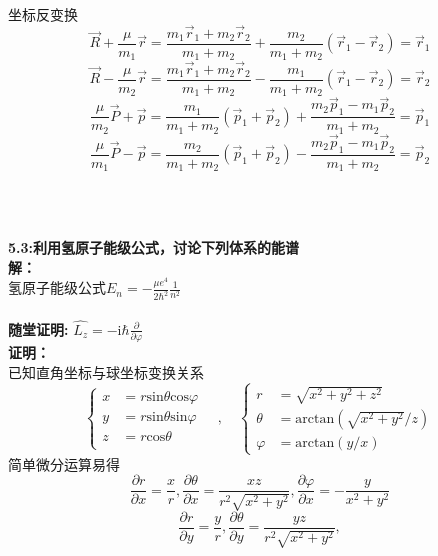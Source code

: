 \documentclass[a4paper]{article}
\newcommand{\qed}{
    \rightline{Q.E.D.}\\
    }
\newcommand{\dis}{\displaystyle}
\begin{document}
\begin{CJK*}{UTF8}{song}
{    坐标反变换
    $$\vec{R} + \frac{\mu}{m_{1}}\vec{r} = 
        \frac{m_{1}\vec{r}_{1}+
        m_{2}\vec{r}_{2}}{m_{1}+m_{2}}+\frac{m_{2}}{m_{1}+m_{2}}
        (\vec{r}_{1}-\vec{r}_{2})
        =\vec{r}_{1}$$
    $$\vec{R} - \frac{\mu}{m_{2}}\vec{r} =
        \frac{m_{1}\vec{r}_{1}+m_{2}\vec{r}_{2}}{m_{1}+m_{2}}
        -\frac{m_{1}}{m_{1}+m_{2}}(\vec{r}_{1}-\vec{r}_{2})
        =\vec{r}_{2}$$
    $$\frac{\mu}{m_{2}}\vec{P}+\vec{p}
        = \frac{m_{1}}{m_{1}+m_{2}}(\vec{p}_{1}+\vec{p}_{2})
        +\frac{m_{2}\vec{p}_{1}-m_{1}\vec{p}_{2}}{m_{1}+m_{2}}
        =\vec{p}_{1}$$
    $$\frac{\mu}{m_{1}}\vec{P}-\vec{p}
        = \frac{m_{2}}{m_{1}+m_{2}}(\vec{p}_{1}+\vec{p}_{2})
        -\frac{m_{2}\vec{p}_{1}-m_{1}\vec{p}_{2}}{m_{1}+m_{2}}
        =\vec{p}_{2}$$
    \qed        
    }\\[20pt]
    \noindent \textbf{5.3:利用氢原子能级公式，讨论下列体系的能谱}\\[8pt]
    {
    \noindent\textbf{解：}\\[5pt]
    氢原子能级公式$\dis E_{n}=-\frac{\mu e^{4}}{2\hbar^{2}}\frac{1}{n^{2}}$\\
    }\\[20pt]
    \noindent \textbf{随堂证明:}\quad
        $\hat{L_{z}}=-\mathrm{i}\hbar\frac{\partial}{\partial\varphi}$\\[8pt]
    {
    \noindent\textbf{证明：}\\[5pt]
    已知直角坐标与球坐标变换关系
    \[\left\{
    \begin{array}{ll}
        x & = r\mathrm{sin}\theta\mathrm{cos}\varphi\\
        y & = r\mathrm{sin}\theta\mathrm{sin}\varphi\\
        z & = r\mathrm{cos}\theta\\\
    \end{array}
    \right.
    \quad,\quad
    \left\{
    \begin{array}{ll}
        r   & = \sqrt{x^{2}+y^{2}+z^{2}}\\
        \theta
            & = \mathrm{arctan}(\sqrt{x^{2}+y^{2}}/z)\\
        \varphi
            & = \mathrm{arctan}(y/x)
    \end{array}
    \right.
    \]
    简单微分运算易得
    $$\frac{\partial r}{\partial x}=\frac{x}{r},
        \frac{\partial\theta}{\partial x}=\frac{xz}{r^{2}\sqrt{x^{2}+y^{2}}},
        \frac{\partial\varphi}{\partial x}=-\frac{y}{x^{2}+y^{2}}$$
    $$\frac{\partial r}{\partial y}=\frac{y}{r},
        \frac{\partial\theta}{\partial y}=\frac{yz}{r^{2}\sqrt{x^{2}+y^{2}}},
$$}
\end{CJK*}
\end{document}
